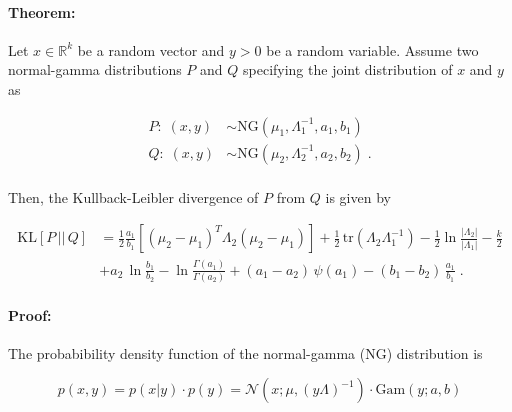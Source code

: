 

\setcounter{equation}{0}



\paragraph{Theorem:}

Let $x \in \mathbb{R}^k$ be a random vector and $y > 0$ be a random variable. Assume two normal-gamma distributions $P$ and $Q$ specifying the joint distribution of $x$ and $y$ as

\vspace{-0.5em}
\begin{equation} \label{eq:NGs}
\begin{split}
P: \; (x,y) &\sim \mathrm{NG}(\mu_1, \Lambda_1^{-1}, a_1, b_1) \\
Q: \; (x,y) &\sim \mathrm{NG}(\mu_2, \Lambda_2^{-1}, a_2, b_2) \; . \\
\end{split}
\end{equation}

Then, the Kullback-Leibler divergence of $P$ from $Q$ is given by

\vspace{-0.5em}
\begin{equation} \label{eq:NG-KL}
\begin{split}
\mathrm{KL}[P\,||\,Q] &= \frac{1}{2} \frac{a_1}{b_1} \left[ (\mu_2 - \mu_1)^T \Lambda_2 (\mu_2 - \mu_1) \right] + \frac{1}{2} \, \mathrm{tr}(\Lambda_2 \Lambda_1^{-1}) - \frac{1}{2} \ln \frac{|\Lambda_2|}{|\Lambda_1|} - \frac{k}{2} \\
&+ a_2 \, \ln \frac{b_1}{b_2} - \ln \frac{\Gamma(a_1)}{\Gamma(a_2)} + (a_1 - a_2) \, \psi(a_1) - (b_1 - b_2) \, \frac{a_1}{b_1} \; .
\end{split}
\end{equation}


\paragraph{Proof:} The probabibility density function of the normal-gamma (NG) distribution is

\begin{equation} \label{eq:NG-pdf}
p(x,y) = p(x|y) \cdot p(y) = \mathcal{N}(x; \mu, (y \Lambda)^{-1}) \cdot \mathrm{Gam}(y; a, b)
\end{equation}

